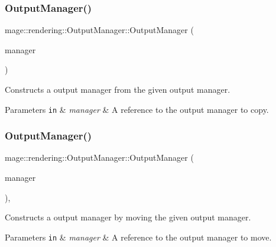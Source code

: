 \subsubsection{\texorpdfstring{Output\+Manager()}{OutputManager()}\hspace{0.1cm}{\footnotesize\ttfamily [2/3]}}
{\footnotesize\ttfamily mage\+::rendering\+::\+Output\+Manager\+::\+Output\+Manager (\begin{DoxyParamCaption}\item[{const \hyperlink{classmage_1_1rendering_1_1_output_manager}{Output\+Manager} \&}]{manager }\end{DoxyParamCaption})\hspace{0.3cm}{\ttfamily [delete]}}

Constructs a output manager from the given output manager.


\begin{DoxyParams}[1]{Parameters}
\mbox{\tt in}  & {\em manager} & A reference to the output manager to copy. \\
\hline
\end{DoxyParams}
\hypertarget{classmage_1_1rendering_1_1_output_manager_aeafc4fb1d7a1904776f738b711635832}{}\label{classmage_1_1rendering_1_1_output_manager_aeafc4fb1d7a1904776f738b711635832} 
\subsubsection{\texorpdfstring{Output\+Manager()}{OutputManager()}\hspace{0.1cm}{\footnotesize\ttfamily [3/3]}}
{\footnotesize\ttfamily mage\+::rendering\+::\+Output\+Manager\+::\+Output\+Manager (\begin{DoxyParamCaption}\item[{\hyperlink{classmage_1_1rendering_1_1_output_manager}{Output\+Manager} \&\&}]{manager }\end{DoxyParamCaption})\hspace{0.3cm}{\ttfamily [default]}, {\ttfamily [noexcept]}}

Constructs a output manager by moving the given output manager.


\begin{DoxyParams}[1]{Parameters}
\mbox{\tt in}  & {\em manager} & A reference to the output manager to move. \\
\hline
\end{DoxyParams}
\hypertarget{classmage_1_1rendering_1_1_output_manager_ad2a02128a123be93391c8058ef2b3a0b}{}\label{classmage_1_1rendering_1_1_output_manager_ad2a02128a123be93391c8058ef2b3a0b} 
